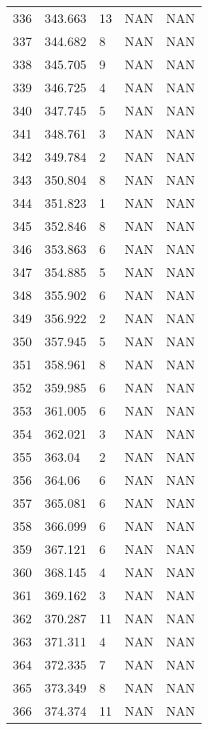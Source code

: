 \documentclass{article}
\begin{document}
\begin{longtable}{@{}lllll@{}}
				336 & 343.663 & 13    & NAN   & NAN   \\
				337 & 344.682 & 8     & NAN   & NAN   \\
				338 & 345.705 & 9     & NAN   & NAN   \\
				339 & 346.725 & 4     & NAN   & NAN   \\
				340 & 347.745 & 5     & NAN   & NAN   \\
				341 & 348.761 & 3     & NAN   & NAN   \\
				342 & 349.784 & 2     & NAN   & NAN   \\
				343 & 350.804 & 8     & NAN   & NAN   \\
				344 & 351.823 & 1     & NAN   & NAN   \\
				345 & 352.846 & 8     & NAN   & NAN   \\
				346 & 353.863 & 6     & NAN   & NAN   \\
				347 & 354.885 & 5     & NAN   & NAN   \\
				348 & 355.902 & 6     & NAN   & NAN   \\
				349 & 356.922 & 2     & NAN   & NAN   \\
				350 & 357.945 & 5     & NAN   & NAN   \\
				351 & 358.961 & 8     & NAN   & NAN   \\
				352 & 359.985 & 6     & NAN   & NAN   \\
				353 & 361.005 & 6     & NAN   & NAN   \\
				354 & 362.021 & 3     & NAN   & NAN   \\
				355 & 363.04  & 2     & NAN   & NAN   \\
				356 & 364.06  & 6     & NAN   & NAN   \\
				357 & 365.081 & 6     & NAN   & NAN   \\
				358 & 366.099 & 6     & NAN   & NAN   \\
				359 & 367.121 & 6     & NAN   & NAN   \\
				360 & 368.145 & 4     & NAN   & NAN   \\
				361 & 369.162 & 3     & NAN   & NAN   \\
				362 & 370.287 & 11    & NAN   & NAN   \\
				363 & 371.311 & 4     & NAN   & NAN   \\
				364 & 372.335 & 7     & NAN   & NAN   \\
				365 & 373.349 & 8     & NAN   & NAN   \\
				366 & 374.374 & 11    & NAN   & NAN   \\

\end{longtable}
\end{document}
